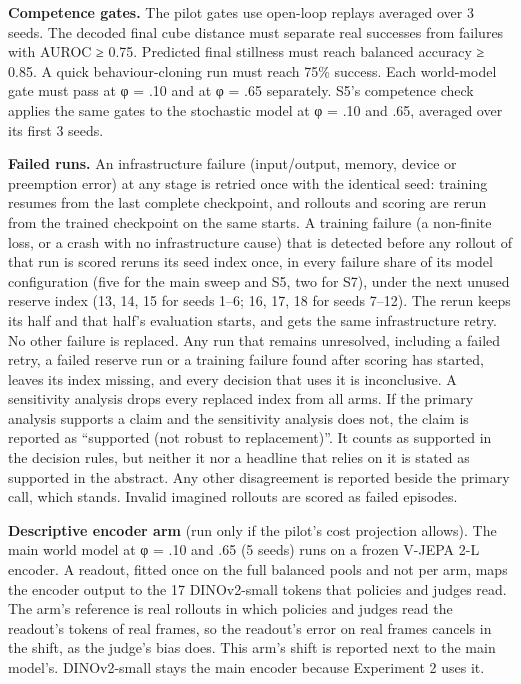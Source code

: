 \documentclass[10pt,letterpaper]{article}
\begin{document}
\textbf{Competence gates.} The pilot gates use open-loop
replays averaged over 3 seeds. The decoded final cube
distance must separate real successes from failures with
AUROC ≥ 0.75. Predicted final stillness must reach balanced
accuracy ≥ 0.85. A quick behaviour-cloning run must reach
75\% success. Each world-model gate must pass at φ = .10 and
at φ = .65 separately. S5's competence check applies the
same gates to the stochastic model at φ = .10 and .65,
averaged over its first 3 seeds.

\textbf{Failed runs.} An infrastructure failure
(input/output, memory, device or preemption error) at any
stage is retried once with the identical seed: training
resumes from the last complete checkpoint, and rollouts and
scoring are rerun from the trained checkpoint on the same
starts. A training failure (a non-finite loss, or a crash
with no infrastructure cause) that is detected before any
rollout of that run is scored reruns its seed index once, in
every failure share of its model configuration (five for the
main sweep and S5, two for S7), under the next unused
reserve index (13, 14, 15 for seeds 1--6; 16, 17, 18 for
seeds 7--12). The rerun keeps its half and that half's
evaluation starts, and gets the same infrastructure retry.
No other failure is replaced. Any run that remains
unresolved, including a failed retry, a failed reserve run
or a training failure found after scoring has started,
leaves its index missing, and every decision that uses it is
inconclusive. A sensitivity analysis drops every replaced
index from all arms. If the primary analysis supports a
claim and the sensitivity analysis does not, the claim is
reported as ``supported (not robust to replacement)''. It
counts as supported in the decision rules, but neither it
nor a headline that relies on it is stated as supported in
the abstract. Any other disagreement is reported beside the
primary call, which stands. Invalid imagined rollouts are
scored as failed episodes.

\textbf{Descriptive encoder arm} (run only if the pilot's
cost projection allows). The main world model at φ = .10 and
.65 (5 seeds) runs on a frozen V-JEPA 2-L encoder. A
readout, fitted once on the full balanced pools and not per
arm, maps the encoder output to the 17 DINOv2-small tokens
that policies and judges read. The arm's reference is real
rollouts in which policies and judges read the readout's
tokens of real frames, so the readout's error on real frames
cancels in the shift, as the judge's bias does. This arm's
shift is reported next to the main model's. DINOv2-small
stays the main encoder because Experiment 2 uses it.
\end{document}
